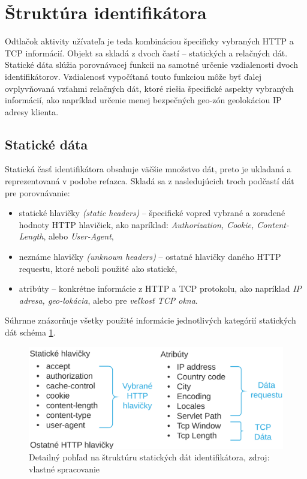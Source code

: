 \documentclass[
  digital, %
  table,   %
  lof,     %
  nolot,   %
  nocover
]{fithesis3}
\begin{document}
\section{Štruktúra identifikátora}
\label{s:footprint-structure}
Odtlačok aktivity užívateľa je teda kombináciou špecificky vybraných HTTP a TCP informácií.
Objekt sa skladá z dvoch častí -- statických a relačných dát. Statické
dáta slúžia porovnávacej funkcii na samotné
určenie vzdialenosti dvoch identifikátorov. Vzdialenosť vypočítaná touto
funkciou môže byť ďalej ovplyvňovaná vzťahmi relačných dát, ktoré riešia
špecifické aspekty vybraných informácií, ako napríklad určenie menej bezpečných
geo-zón geolokáciou IP adresy klienta.

\subsection{Statické dáta}
Statická časť identifikátora obsahuje väčšie množstvo dát, preto je
ukladaná a reprezentovaná v podobe reťazca. Skladá sa z nasledujúcich troch podčastí dát pre porovnávanie:
\begin{itemize}
    \item statické hlavičky \textit{(static headers)} -- špecifické vopred
    vybrané a zoradené hodnoty HTTP hlavičiek, ako napríklad: \textit{Authorization, Cookie, Content-Length}, alebo
    \textit{User-Agent},
    \item neznáme hlavičky \textit{(unknown headers)} -- ostatné hlavičky daného
    HTTP requestu, ktoré neboli použité ako statické,
    \item atribúty -- konkrétne informácie z HTTP a TCP protokolu, ako napríklad
    \textit{IP adresa, geo-lokácia}, alebo pre \textit{veľkosť TCP okna}.
\end{itemize}

Súhrnne znázorňuje všetky použité informácie jednotlivých kategórií statických dát schéma
\ref{fig:footprint-data-static}.

\begin{figure}[t]
  \centering
    \includegraphics[width=.95\textwidth]{images/footprint-data-static.png}
  \caption{Detailný pohľad na štruktúru statických dát identifikátora, zdroj:
  vlastné spracovanie}
  \label{fig:footprint-data-static}
\end{figure}
\end{document}
